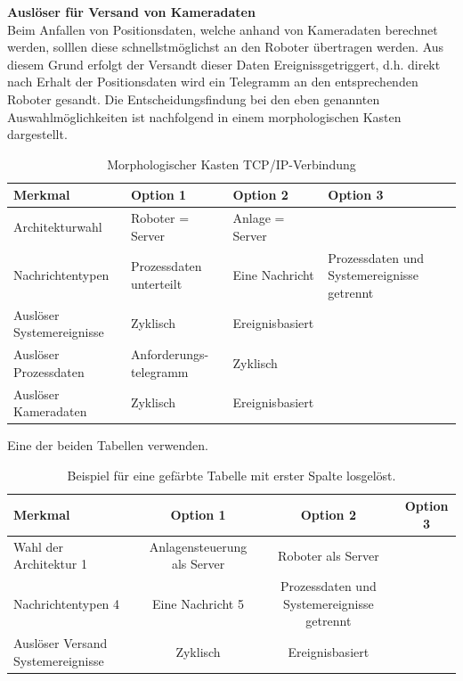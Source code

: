 \documentclass[ a4paper,
                oneside,
                toc=bibliography,
                toc=listof
                ]{scrbook}
\begin{document}
	\textbf{Auslöser für Versand von Kameradaten} \\
	Beim Anfallen von Positionsdaten, welche anhand von Kameradaten berechnet werden, solllen diese schnellstmöglichst an den Roboter übertragen werden. Aus diesem Grund erfolgt der Versandt dieser Daten Ereignissgetriggert, d.h. direkt nach Erhalt der Positionsdaten wird ein Telegramm an den entsprechenden Roboter gesandt.
	Die Entscheidungsfindung bei den eben genannten Auswahlmöglichkeiten ist nachfolgend in einem morphologischen Kasten dargestellt.
	\begin{longtable}{|p{3cm}|p{3.5cm}|p{3.5cm}|p{3.5cm}|}
		\caption{Morphologischer Kasten TCP/IP-Verbindung}
		\label{table:MorphoTCPIP}\\
		\hline
		Merkmal & Option 1 & Option 2 & Option 3 \\ [0.5ex] 
		\hline
		\endhead
		Architekturwahl & Roboter = Server & \cellcolor{green!10}Anlage = Server &\\ 
		Nachrichtentypen & Prozessdaten unterteilt & Eine Nachricht & \cellcolor{green!10}Prozessdaten und Systemereignisse getrennt\\
		Auslöser Systemereignisse & Zyklisch & \cellcolor{green!10}Ereignisbasiert&  \\
		Auslöser Prozessdaten & \cellcolor{green!10}Anforderungs-telegramm & Zyklisch &  \\
		Auslöser Kameradaten & Zyklisch & \cellcolor{green!10}Ereignisbasiert&  \\
		\hline
	\end{longtable}
	Eine der beiden Tabellen verwenden.
	\begin{table}
		\centering
		\begin{tabular}{>{\columncolor{gray!20}}lccc}
			\toprule
			\textbf{Merkmal} & \textbf{Option 1} & \textbf{Option 2} &  \textbf{Option 3}\\
			\midrule
			Wahl der Architektur 1 & \cellcolor{green!10}Anlagensteuerung als Server & Roboter als Server &\\
			Nachrichtentypen 4 & Eine Nachricht 5 & Prozessdaten und Systemereignisse getrennt & \\
			Auslöser Versand Systemereignisse & Zyklisch & \cellcolor{green!10}Ereignisbasiert & \\
			\bottomrule
		\end{tabular}
		\caption{Beispiel für eine gefärbte Tabelle mit erster Spalte losgelöst.}
		\label{tab:gefaerbte_tabelle_ohne_erste_spalte} 
	\end{table}\newline
\end{document}
